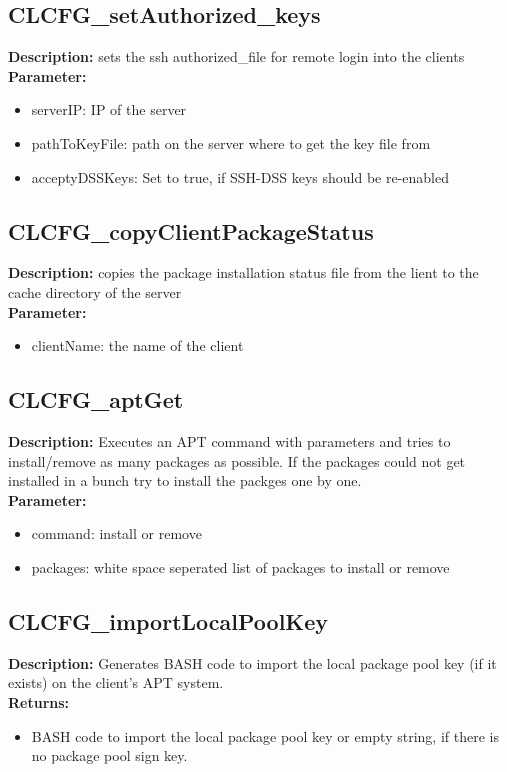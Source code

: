 \subsection{CLCFG\_setAuthorized\_keys}
\textbf{Description:} sets the ssh authorized\_file for remote login into the clients\\
\textbf{Parameter:}
\begin{itemize}
\item serverIP: IP of the server
\item pathToKeyFile: path on the server where to get the key file from
\item acceptyDSSKeys: Set to true, if SSH-DSS keys should be re-enabled
\end{itemize}

\subsection{CLCFG\_copyClientPackageStatus}
\textbf{Description:} copies the package installation status file from the lient to the cache directory of the server\\
\textbf{Parameter:}
\begin{itemize}
\item clientName: the name of the client
\end{itemize}

\subsection{CLCFG\_aptGet}
\textbf{Description:} Executes an APT command with parameters and tries to install/remove as many packages as possible. If the packages could not get installed in a bunch try to install the packges one by one.\\
\textbf{Parameter:}
\begin{itemize}
\item command: install or remove
\item packages: white space seperated list of packages to install or remove
\end{itemize}

\subsection{CLCFG\_importLocalPoolKey}
\textbf{Description:} Generates BASH code to import the local package pool key (if it exists) on the client's APT system.\\
\textbf{Returns:}
\begin{itemize}
\item BASH code to import the local package pool key or empty string, if there is no package pool sign key.
\end{itemize}

